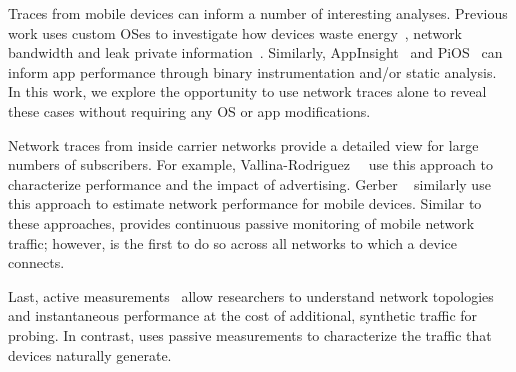 Traces from mobile devices can inform a number of interesting analyses. Previous work 
uses custom OSes to investigate how devices waste energy~\cite{pathak:eprof}, network bandwidth and 
leak private information~\cite{enck:taintdroid,hornyack:appfence}. Similarly, AppInsight~\cite{ravindranath:appinsight} and PiOS~\cite{egele:pios} can inform 
app performance through binary instrumentation and/or static analysis. In this work, we explore the opportunity to use network traces 
alone to reveal these cases without requiring any OS or app modifications.

Network traces from inside carrier networks provide a detailed view for large numbers 
of subscribers. For example, Vallina-Rodriguez~\etal~\cite{vallina-rod:ads} use this approach to characterize performance and 
the impact of advertising. Gerber \etal~\cite{gerber:passivespeed} similarly use this approach to 
estimate network performance for mobile devices.  %
Similar to these approaches, \platname provides continuous passive monitoring of mobile network 
traffic; however, \platname is the first to do so across all networks to which a device connects.

Last, active measurements~\cite{wang:middleboxes,sommers:cellwifi} allow researchers to understand network topologies and instantaneous 
performance at the cost of additional, synthetic traffic for probing. In contrast, \platname uses 
passive measurements to characterize the traffic that devices
naturally generate.



